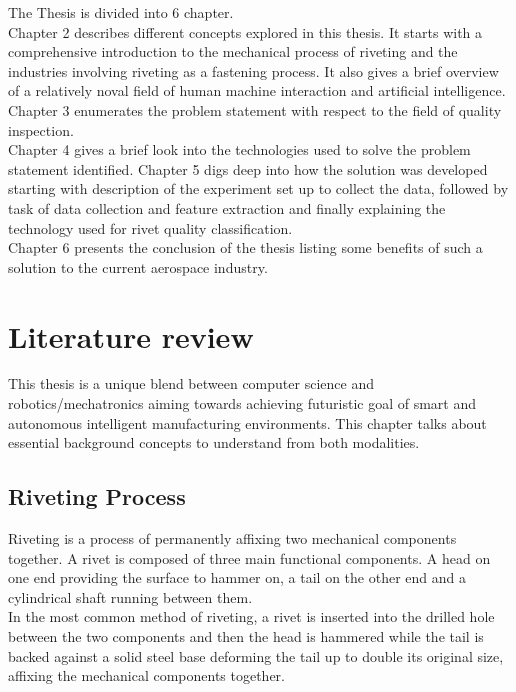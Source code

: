 \documentclass{article}
\begin{document}
The Thesis is divided into 6 chapter.\\
\noindent Chapter 2 describes different concepts explored in this thesis. It starts with a comprehensive introduction to the mechanical process of riveting and the industries involving riveting as a fastening process. It also gives a brief overview of a relatively noval field of human machine interaction and artificial intelligence. \\
Chapter 3 enumerates the problem statement with respect to the field of quality inspection.\\
Chapter 4 gives a brief look into the technologies used to solve the problem statement identified.
Chapter 5 digs deep into how the solution was developed starting with description of the experiment set up to collect the data, followed by task of data collection and feature extraction and finally explaining the technology used for rivet quality classification. \\
Chapter 6 presents the conclusion of the thesis listing some benefits of such a solution to the current aerospace industry.




 
\newpage
\section{Literature review}

This thesis is a unique blend between computer science and robotics/mechatronics aiming towards achieving futuristic goal of smart and autonomous intelligent manufacturing environments. This chapter talks about essential background concepts to understand from both modalities.

\subsection{Riveting Process}

Riveting is a process of permanently affixing two mechanical components together. A rivet is composed of three main functional components. A head on one end providing the surface to hammer on, a tail on the other end and a cylindrical shaft running between them.\cite{rivet} \\



In the most common method of riveting, a rivet is inserted into the drilled hole between the two components and then the head is hammered while the tail is backed against a solid steel base deforming the tail up to double its original size, affixing the mechanical components together.\newline
\end{document}
